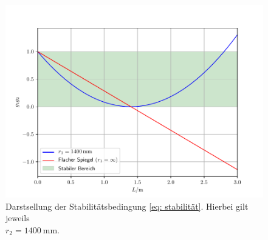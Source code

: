 \begin{figure}
  \centering
  \includegraphics[width = \textwidth]{theorie_bilder/g_1_g_2.pdf}
  \caption{Darstsellung der Stabilitätsbedingung \eqref{eq: stabilität}. Hierbei gilt jeweils \\$r_2 = \SI{1400}{\milli\meter}$.}
  \label{fig: stabilitätsbedingung}
\end{figure}

